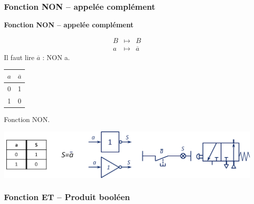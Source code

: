 \subsubsection{Fonction NON -- appelée complément}
\begin{defi}
\textbf{Fonction NON -- appelée complément}

\begin{minipage}[c]{.45\linewidth}
\begin{eqnarray*}
B &\longmapsto& B\\
a &\longmapsto& \overline{a}
\end{eqnarray*}
Il faut lire $\overline{a}$ : NON a.
\end{minipage} \hfill
\begin{minipage}[c]{.45\linewidth}
\begin{center}
\begin{tabular}{|c||c|}
\hline
$a$ & $\overline{a}$ \\
\hline
0 & 1 \\
\hline
1 & 0 \\
\hline
\end{tabular}
\end{center}
\end{minipage}
\end{defi}

\begin{exemple}
Fonction NON.


\begin{center}
\includegraphics[width=.9\textwidth]{images/NON}
\end{center}

\end{exemple}


\subsubsection{Fonction ET -- Produit booléen}

